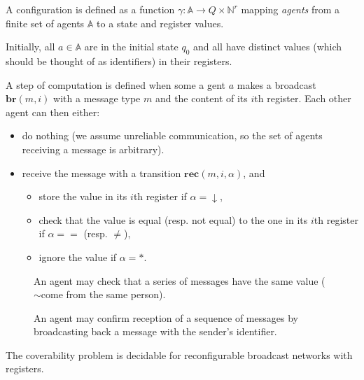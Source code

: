 \documentclass{article}
\newcommand{\nats}{\mathbb{N}}
\theoremstyle{definition}
\begin{document}
		
		A configuration is defined as a function $\gamma : \mathbb{A} \to Q \times \nats^{r}$ mapping \emph{agents} from a finite set of agents $\mathbb{A}$ to a state and register values.
		
		Initially, all $a \in \mathbb{A}$ are in the initial state $q_0$ and all have distinct values (which should be thought of as identifiers) in their registers. 
			
		A step of computation is defined when some a gent $a$ makes a broadcast $\mathbf{br}(m,i)$ with a message type $m$ and the content of its $i$th register. Each other agent can then either:
			\begin{itemize}
				\item do nothing (we assume unreliable communication, so the set of agents receiving a message is arbitrary).
				\item receive the message with a transition $\mathbf{rec}(m, i, \alpha)$, and\vspace{-0.3cm}
				\begin{itemize}
					\item store the value in its $i$th register if $\alpha = \downarrow$,
					\item check that the value is equal (resp. not equal) to the one in its $i$th register if $\alpha = =$ (resp. $\neq$),
					\item ignore the value if $\alpha=*$.
				\end{itemize}
			\end{itemize}\vspace{-0.3cm}
	
	\begin{figure}[h]
		\centering
		\begin{minipage}{.47\textwidth}
		\centering
		
		\caption{An agent may check that a series of messages have the same value ($\sim$come from the same person).}
		\label{fig:pred}
		\end{minipage}%
		\hfill
		\begin{minipage}{.47\textwidth}
		\centering
		
		\label{fig:suc}
		\caption{An agent may confirm reception of a sequence of messages by broadcasting back a message with the sender's identifier.}
		\end{minipage}
	\end{figure}
	
	
	
	\begin{theorem}
		The coverability problem is decidable for reconfigurable broadcast networks with registers.
	\end{theorem}
	
\end{document}
